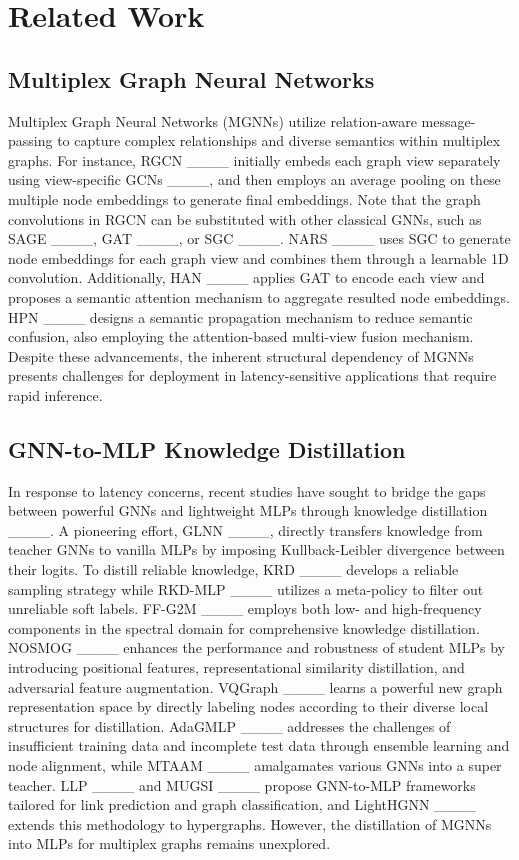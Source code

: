 \section{Related Work}
\subsection{Multiplex Graph Neural Networks}
Multiplex Graph Neural Networks (MGNNs) utilize relation-aware message-passing to capture complex relationships and diverse semantics within multiplex graphs. For instance, RGCN ____ initially embeds each graph view separately using view-specific GCNs ____, and then employs an average pooling on these multiple node embeddings to generate final embeddings. Note that the graph convolutions in RGCN can be substituted with other classical GNNs, such as SAGE ____, GAT ____, or SGC ____. NARS ____ uses SGC to generate node embeddings for each graph view and combines them through a learnable 1D convolution. Additionally, HAN ____ applies GAT to encode each view and proposes a semantic attention mechanism to aggregate resulted node embeddings. HPN ____ designs a semantic propagation mechanism to reduce semantic confusion, also employing the attention-based multi-view fusion mechanism. Despite these advancements, the inherent structural dependency of MGNNs presents challenges for deployment in latency-sensitive applications that require rapid inference.

\subsection{GNN-to-MLP Knowledge Distillation}
In response to latency concerns, recent studies have sought to bridge the gaps between powerful GNNs and lightweight MLPs through knowledge distillation ____. A pioneering effort, GLNN ____, directly transfers knowledge from teacher GNNs to vanilla MLPs by imposing Kullback-Leibler divergence between their logits. To distill reliable knowledge, KRD ____ develops a reliable sampling strategy while RKD-MLP ____ utilizes a meta-policy to filter out unreliable soft labels. FF-G2M ____ employs both low- and high-frequency components in the spectral domain for comprehensive knowledge distillation. NOSMOG ____ enhances the performance and robustness of student MLPs by introducing positional features, representational similarity distillation, and adversarial feature augmentation. VQGraph ____ learns a powerful new graph representation space by directly labeling nodes according to their diverse local structures for distillation. AdaGMLP ____ addresses the challenges of insufficient training data and incomplete test data through ensemble learning and node alignment, while MTAAM ____ amalgamates various GNNs into a super teacher. 
LLP ____ and MUGSI ____ propose GNN-to-MLP frameworks tailored for link prediction and graph classification, and LightHGNN ____ extends this methodology to hypergraphs. However, the distillation of MGNNs into MLPs for multiplex graphs remains unexplored.